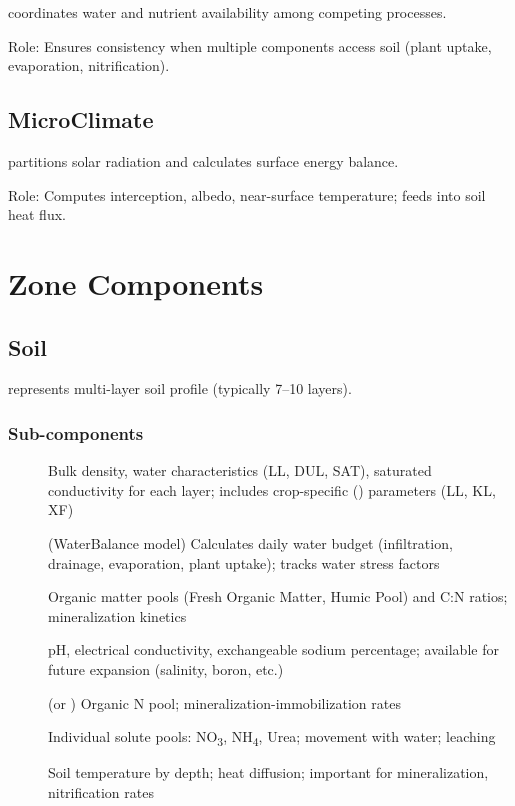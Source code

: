  coordinates water and nutrient availability among competing processes.

Role: Ensures consistency when multiple components access soil (plant uptake, evaporation, nitrification).

\subsection{MicroClimate}

 partitions solar radiation and calculates surface energy balance.

Role: Computes interception, albedo, near-surface temperature; feeds into soil heat flux.

\section{Zone Components}

\subsection{Soil}

 represents multi-layer soil profile (typically 7--10 layers).

\subsubsection{Sub-components}

\begin{description}
  \item[] Bulk density, water characteristics (LL, DUL, SAT), saturated conductivity for each layer; includes crop-specific () parameters (LL, KL, XF)
  
  \item[] (WaterBalance model) Calculates daily water budget (infiltration, drainage, evaporation, plant uptake); tracks water stress factors
  
  \item[] Organic matter pools (Fresh Organic Matter, Humic Pool) and C:N ratios; mineralization kinetics
  
  \item[] pH, electrical conductivity, exchangeable sodium percentage; available for future expansion (salinity, boron, etc.)
  
  \item[] (or ) Organic N pool; mineralization-immobilization rates
  
  \item[] Individual solute pools: NO\textsubscript{3}, NH\textsubscript{4}, Urea; movement with water; leaching
  
  \item[] Soil temperature by depth; heat diffusion; important for mineralization, nitrification rates
\end{description}

